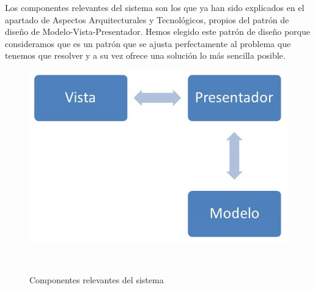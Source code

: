 Los componentes relevantes del sistema son los que ya han sido explicados en el apartado de Aspectos Arquitecturales y Tecnológicos, propios del patrón de diseño de Modelo-Vista-Presentador. Hemos elegido este patrón de diseño porque consideramos que es un patrón que se ajusta perfectamente al problema que tenemos que resolver y a su vez ofrece una solución lo más sencilla posible.

\vspace{.2cm}
\begin{figure}[ht]
\centerline{\includegraphics[scale=0.6]{img/componentes}}\
\caption{Componentes relevantes del sistema}
\label{fig:diagCompon}
\end{figure}